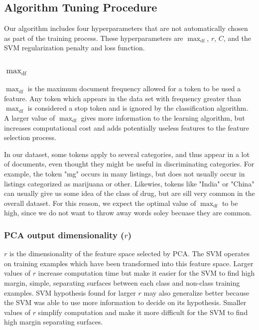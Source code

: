 \subsection{Algorithm Tuning Procedure}
\newcommand{\maxdf}{\max_{\text{df}}}
Our algorithm includes four hyperparameters that are not automatically chosen as part of the training process.
These hyperparameters are $\maxdf$, $r$, $C$, and the SVM regularization penalty and loss function.

\subsubsection{$\maxdf$}
$\maxdf$ is the maximum document frequency allowed for a token to be used a feature.
Any token which appears in the data set with frequency greater than $\maxdf$ is considered a stop token and is ignored by the classification algorithm.
A larger value of $\maxdf$ gives more information to the learning algorithm, but increases computational cost and adds potentially useless features to the feature selection process.

In our dataset, some tokens apply to several categories, and thus appear in a lot of documents,
even thought they might be useful in discriminating categories.
For example, the token "mg" occurs in many listings, but does not usually occur in listings categorized as marijuana or other.
Likewies, tokens like "India" or "China" can usually give us some idea of the class of drug, but are sill very common in the overall dataset.
For this reason, we expect the optimal value of $\maxdf$ to be high, since we do not want to throw away words soley becuase they are common. 

\subsubsection{PCA output dimensionality ($r$)}
$r$ is the dimensionality of the feature space selected by PCA.
The SVM operates on training examples which have been transformed into this feature space.
Larger values of $r$ increase computation time but make it easier for the SVM to find high margin, simple, separating surfaces between each class and non-class training examples.
SVM hypothesis found for larger $r$ may also generalize better because the SVM was able to use more information to decide on its hypothesis.
Smaller values of $r$ simplify computation and make it more difficult for the SVM to find high margin separating surfaces.

